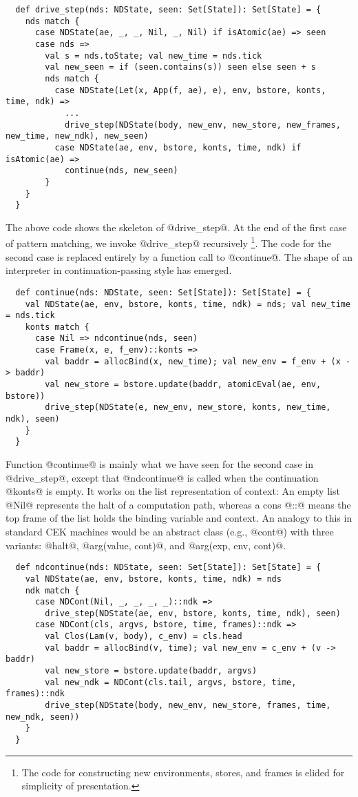 \documentclass[acmsmall, review]{acmart}\settopmatter{}
\begin{document}
\begin{lstlisting}
  def drive_step(nds: NDState, seen: Set[State]): Set[State] = {
    nds match {
      case NDState(ae, _, _, Nil, _, Nil) if isAtomic(ae) => seen
      case nds =>
        val s = nds.toState; val new_time = nds.tick
        val new_seen = if (seen.contains(s)) seen else seen + s
        nds match {
          case NDState(Let(x, App(f, ae), e), env, bstore, konts, time, ndk) =>
            ...
            drive_step(NDState(body, new_env, new_store, new_frames, new_time, new_ndk), new_seen)
          case NDState(ae, env, bstore, konts, time, ndk) if isAtomic(ae) =>
            continue(nds, new_seen)
        }
    }
  }
\end{lstlisting}

The above code shows the skeleton of @drive_step@.
At the end of the first case of pattern matching, we invoke @drive_step@ recursively 
\footnote{The code for constructing new environments, stores, and frames is elided for 
simplicity of presentation.}.
The code for the second case is replaced entirely by a function call to @continue@.
The shape of an interpreter in continuation-passing style has emerged.

\begin{lstlisting}
  def continue(nds: NDState, seen: Set[State]): Set[State] = {
    val NDState(ae, env, bstore, konts, time, ndk) = nds; val new_time = nds.tick
    konts match {
      case Nil => ndcontinue(nds, seen)
      case Frame(x, e, f_env)::konts =>
        val baddr = allocBind(x, new_time); val new_env = f_env + (x -> baddr)
        val new_store = bstore.update(baddr, atomicEval(ae, env, bstore))
        drive_step(NDState(e, new_env, new_store, konts, new_time, ndk), seen)
    }
  }
\end{lstlisting}

Function @continue@ is mainly what we have seen for the second case in @drive_step@,
except that @ndcontinue@ is called when the continuation @konts@ is empty.
It works on the list representation of context: An empty list @Nil@ represents the
halt of a computation path, whereas a cons @::@ means the top frame of the list
holds the binding variable and context.
An analogy to this in standard CEK machines would be an abstract class (e.g., @cont@)
with three variants: @halt@, @arg(value, cont)@, and @arg(exp, env, cont)@.

\begin{lstlisting}
  def ndcontinue(nds: NDState, seen: Set[State]): Set[State] = {
    val NDState(ae, env, bstore, konts, time, ndk) = nds
    ndk match {
      case NDCont(Nil, _, _, _, _)::ndk =>
        drive_step(NDState(ae, env, bstore, konts, time, ndk), seen)
      case NDCont(cls, argvs, bstore, time, frames)::ndk =>
        val Clos(Lam(v, body), c_env) = cls.head
        val baddr = allocBind(v, time); val new_env = c_env + (v -> baddr)
        val new_store = bstore.update(baddr, argvs)
        val new_ndk = NDCont(cls.tail, argvs, bstore, time, frames)::ndk
        drive_step(NDState(body, new_env, new_store, frames, time, new_ndk, seen))
    }
  }
\end{lstlisting}
\end{document}
